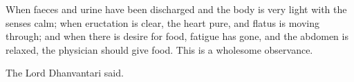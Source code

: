 \begin{translation}
\item[107]
When faeces and urine have been discharged %
and the body is very light with the senses calm; %
when eructation is clear, the heart pure, and flatus is moving through;
and when there is desire for food, %
fatigue has gone, %
and the abdomen is relaxed,
the physician should give food. %
This is a wholesome observance. %

\item[108]
The Lord Dhanvantari said.
\end{translation}    
